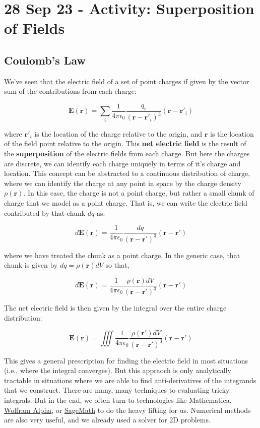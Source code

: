 \section{28 Sep 23 - Activity: Superposition of
Fields}\label{sep-23---activity-superposition-of-fields}

\subsection{Coulomb's Law}\label{coulombs-law}

We've seen that the electric field of a set of point charges if given by
the vector sum of the contributions from each charge:

\[\mathbf{E}(\mathbf{r}) = \sum_i \frac{1}{4\pi\epsilon_0} \frac{q_i}{(\mathbf{r}-\mathbf{r}'_i)^3} (\mathbf{r}-\mathbf{r}'_i)\]

where \(\mathbf{r}'_i\) is the location of the charge relative to the
origin, and \(\mathbf{r}\) is the location of the field point relative
to the origin. This \textbf{net electric field} is the result of the
\textbf{superposition} of the electric fields from each charge. But here
the charges are discrete, we can identify each charge uniquely in terms
of it's charge and location. This concept can be abstracted to a
continuous distribution of charge, where we can identify the charge at
any point in space by the charge density \(\rho(\mathbf{r})\). In this
case, the charge is not a point charge, but rather a small chunk of
charge that we model as a point charge. That is, we can write the
electric field contributed by that chunk \(dq\) as:

\[d\mathbf{E}(\mathbf{r}) = \frac{1}{4\pi\epsilon_0} \frac{dq}{(\mathbf{r}-\mathbf{r}')^3} (\mathbf{r}-\mathbf{r}')\]

where we have treated the chunk as a point charge. In the generic case,
that chunk is given by \(dq = \rho(\mathbf{r})dV\) so that,

\[d\mathbf{E}(\mathbf{r}) = \frac{1}{4\pi\epsilon_0} \frac{\rho(\mathbf{r})dV}{(\mathbf{r}-\mathbf{r}')^3} (\mathbf{r}-\mathbf{r}')\]

The net electric field is then given by the integral over the entire
charge distribution:

\[\mathbf{E}(\mathbf{r}) = \iiint \frac{1}{4\pi\epsilon_0} \frac{\rho(\mathbf{r}')dV}{(\mathbf{r}-\mathbf{r}')^3} (\mathbf{r}-\mathbf{r}')\]

This gives a general prescription for finding the electric field in most
situations (i.e., where the integral converges). But this appraoch is
only analytically tractable in situations where we are able to find
anti-derivatives of the integrands that we construct. There are many,
many techniques to evaluating tricky integrals. But in the end, we often
turn to technologies like Mathematica,
\href{https://www.wolframalpha.com/}{Wolfram Alpha}, or
\href{https://www.sagemath.org/}{SageMath} to do the heavy lifting for
us. Numerical methods are also very useful, and we already used a solver
for 2D problems.

